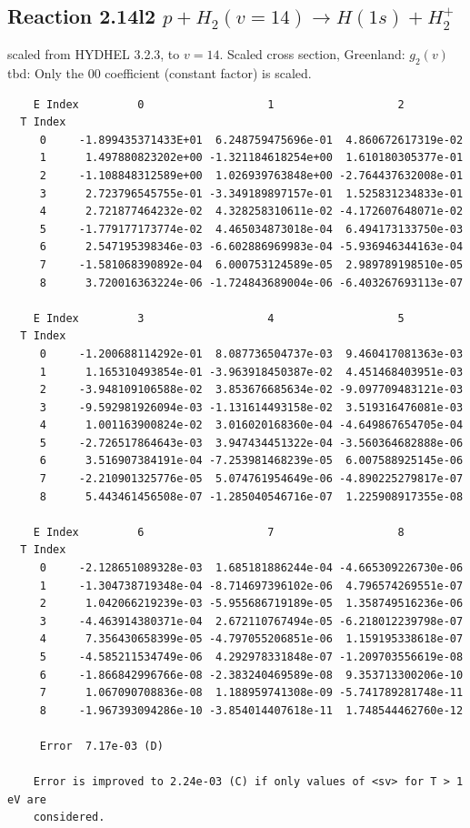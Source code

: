 \documentclass[12pt,dvipdfmx]{article}
\begin{document}
\subsection{
Reaction 2.14l2 $   p + H_2(v=14) \rightarrow H(1s) + H_2^+$}
scaled from HYDHEL 3.2.3, to $v=14$. Scaled cross section, Greenland: $g_2(v)$
tbd:
Only the 00 coefficient (constant factor) is scaled.


\begin{small}\begin{verbatim}
    E Index         0                   1                   2
  T Index
     0     -1.899435371433E+01  6.248759475696e-01  4.860672617319e-02
     1      1.497880823202e+00 -1.321184618254e+00  1.610180305377e-01
     2     -1.108848312589e+00  1.026939763848e+00 -2.764437632008e-01
     3      2.723796545755e-01 -3.349189897157e-01  1.525831234833e-01
     4      2.721877464232e-02  4.328258310611e-02 -4.172607648071e-02
     5     -1.779177173774e-02  4.465034873018e-04  6.494173133750e-03
     6      2.547195398346e-03 -6.602886969983e-04 -5.936946344163e-04
     7     -1.581068390892e-04  6.000753124589e-05  2.989789198510e-05
     8      3.720016363224e-06 -1.724843689004e-06 -6.403267693113e-07

    E Index         3                   4                   5
  T Index
     0     -1.200688114292e-01  8.087736504737e-03  9.460417081363e-03
     1      1.165310493854e-01 -3.963918450387e-02  4.451468403951e-03
     2     -3.948109106588e-02  3.853676685634e-02 -9.097709483121e-03
     3     -9.592981926094e-03 -1.131614493158e-02  3.519316476081e-03
     4      1.001163900824e-02  3.016020168360e-04 -4.649867654705e-04
     5     -2.726517864643e-03  3.947434451322e-04 -3.560364682888e-06
     6      3.516907384191e-04 -7.253981468239e-05  6.007588925145e-06
     7     -2.210901325776e-05  5.074761954649e-06 -4.890225279817e-07
     8      5.443461456508e-07 -1.285040546716e-07  1.225908917355e-08

    E Index         6                   7                   8
  T Index
     0     -2.128651089328e-03  1.685181886244e-04 -4.665309226730e-06
     1     -1.304738719348e-04 -8.714697396102e-06  4.796574269551e-07
     2      1.042066219239e-03 -5.955686719189e-05  1.358749516236e-06
     3     -4.463914380371e-04  2.672110767494e-05 -6.218012239798e-07
     4      7.356430658399e-05 -4.797055206851e-06  1.159195338618e-07
     5     -4.585211534749e-06  4.292978331848e-07 -1.209703556619e-08
     6     -1.866842996766e-08 -2.383240469589e-08  9.353713300206e-10
     7      1.067090708836e-08  1.188959741308e-09 -5.741789281748e-11
     8     -1.967393094286e-10 -3.854014407618e-11  1.748544462760e-12

     Error  7.17e-03 (D)

    Error is improved to 2.24e-03 (C) if only values of <sv> for T > 1 eV are
    considered.
\end{verbatim}\end{small}
\newpage
\end{document}
